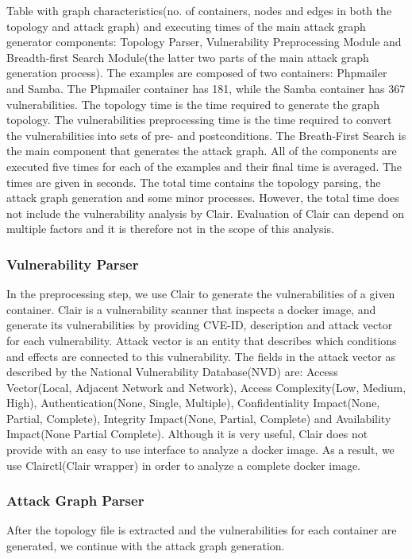 \begin{table}
		\caption{Table with graph characteristics(no. of containers, nodes and edges in both the topology and attack graph) and executing times of the main attack graph generator components: Topology Parser, Vulnerability Preprocessing Module and Breadth-first Search Module(the latter two parts of the main attack graph generation process). The examples are composed of two containers: Phpmailer and Samba. The Phpmailer container has 181, while the Samba container has 367 vulnerabilities. The topology time is the time required to generate the graph topology. The vulnerabilities preprocessing time is the time required to convert the vulnerabilities into sets of pre- and postconditions. The Breath-First Search is the main component that generates the attack graph. All of the components are executed five times for each of the examples and their final time is averaged. The times are given in seconds. The total time contains the topology parsing, the attack graph generation and some minor processes. However, the total time does not include the vulnerability analysis by Clair. Evaluation of Clair can depend on multiple factors and it is therefore not in the scope of this analysis.}
		
		\label{table_scalability}
	\end{table}
	
	\subsubsection{Vulnerability Parser}
	In the preprocessing step, we use Clair to generate the vulnerabilities of a given container. Clair is a vulnerability scanner that inspects a docker image, and generate its vulnerabilities by providing CVE-ID, description and attack vector for each vulnerability. Attack vector is an entity that describes which conditions and effects are connected to this vulnerability. The fields in the attack vector as described by the National Vulnerability Database(NVD) \cite{booth2013national} are: Access Vector(Local, Adjacent Network and Network), Access Complexity(Low, Medium, High), Authentication(None, Single, Multiple), Confidentiality Impact(None, Partial, Complete), Integrity Impact(None, Partial, Complete) and Availability Impact(None Partial Complete). Although it is very useful, Clair does not provide with an easy to use interface to analyze a docker image. As a result, we use Clairctl(Clair wrapper) in order to analyze a complete docker image.
	
	
	\subsubsection{Attack Graph Parser}
	After the topology file is extracted and the vulnerabilities for each container are generated, we continue with the attack graph generation.
	
